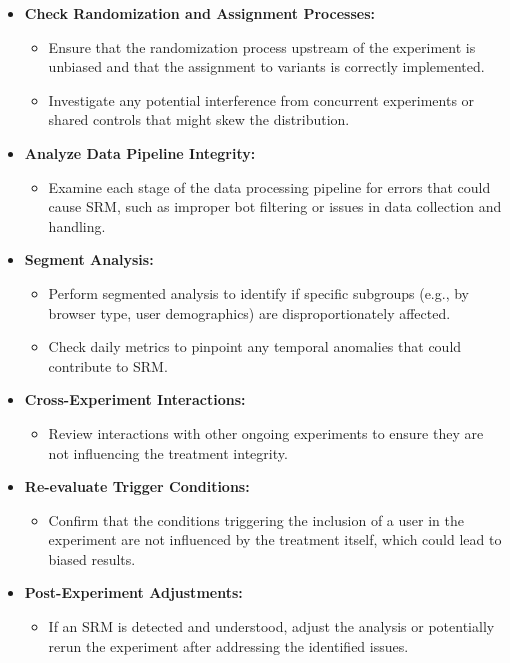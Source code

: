 \documentclass{article}
\begin{document}
\begin{itemize}
    \item \textbf{Check Randomization and Assignment Processes:}
    \begin{itemize}
        \item Ensure that the randomization process upstream of the experiment is unbiased and that the assignment to variants is correctly implemented.
        \item Investigate any potential interference from concurrent experiments or shared controls that might skew the distribution.
    \end{itemize}

    \item \textbf{Analyze Data Pipeline Integrity:}
    \begin{itemize}
        \item Examine each stage of the data processing pipeline for errors that could cause SRM, such as improper bot filtering or issues in data collection and handling.
    \end{itemize}

    \item \textbf{Segment Analysis:}
    \begin{itemize}
        \item Perform segmented analysis to identify if specific subgroups (e.g., by browser type, user demographics) are disproportionately affected.
        \item Check daily metrics to pinpoint any temporal anomalies that could contribute to SRM.
    \end{itemize}

    \item \textbf{Cross-Experiment Interactions:}
    \begin{itemize}
        \item Review interactions with other ongoing experiments to ensure they are not influencing the treatment integrity.
    \end{itemize}

    \item \textbf{Re-evaluate Trigger Conditions:}
    \begin{itemize}
        \item Confirm that the conditions triggering the inclusion of a user in the experiment are not influenced by the treatment itself, which could lead to biased results.
    \end{itemize}

    \item \textbf{Post-Experiment Adjustments:}
    \begin{itemize}
        \item If an SRM is detected and understood, adjust the analysis or potentially rerun the experiment after addressing the identified issues.
    \end{itemize}
\end{itemize}
\end{document}
